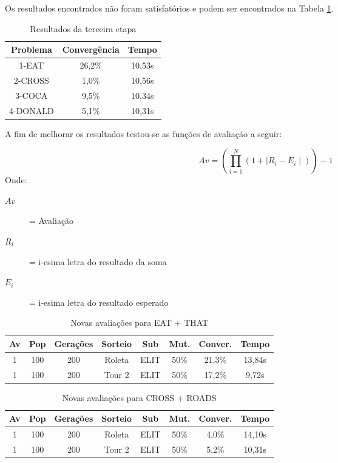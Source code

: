 \documentclass[a4paper, 12pt]{article}
\begin{document}
Os resultados encontrados não foram satisfatórios e podem ser encontrados na
Tabela \ref{tab:etapa3}.

  \begin{table}[h]
    \centering
    \begin{tabular}{|c|c|c|}
      \hline
      Problema & Convergência & Tempo \\
      \hline
      1-EAT & 26,2\% & 10,53s \\
      \hline
      2-CROSS & 1,0\% & 10,56s \\
      \hline
      3-COCA & 9,5\% & 10,34s \\
      \hline
      4-DONALD & 5,1\% & 10,31s \\
      \hline
    \end{tabular}
    \caption{Resultados da terceira etapa}
    \label{tab:etapa3}
  \end{table}

A fim de melhorar os resultados testou-se as funções de avaliação a seguir:

  \begin{equation}
    Av = (\prod_{i=1}^{N} (1+\mid R_i - E_i\mid)) -1
    \label{eq:avprod}
  \end{equation}
Onde:
  \begin{description}
    \item[\(Av\)] = Avaliação
    \item[\(R_i\)] = i-esima letra do resultado da soma
    \item[\(E_i\)] = i-esima letra do resultado esperado
  \end{description}

  \begin{table}[h]
    \centering
    \begin{tabular}{|c|c|c|c|c|c|c|c|}
      \hline
      Av & Pop & Gerações & Sorteio & Sub & Mut. & Conver. & Tempo  \\
      \hline
      1 & 100 & 200 & Roleta & ELIT & 50\% &21,3\% & 13,84s \\
      \hline
      1 & 100 & 200 & Tour 2 & ELIT & 50\% &17,2\% & 9,72s \\
      \hline
    \end{tabular}
    \caption{Novas avaliações para EAT + THAT}
    \label{tab:eat}
  \end{table}

  \begin{table}[h]
    \centering
    \begin{tabular}{|c|c|c|c|c|c|c|c|}
      \hline
      Av & Pop & Gerações & Sorteio & Sub & Mut. & Conver. & Tempo  \\
      \hline
      1 & 100 & 200 & Roleta & ELIT & 50\% &4,0\% & 14,10s \\
      \hline
      1 & 100 & 200 & Tour 2 & ELIT & 50\% &5,2\% & 10,31s \\
      \hline
    \end{tabular}
    \caption{Novas avaliações para CROSS + ROADS}
    \label{tab:cross}
  \end{table}
\end{document}
